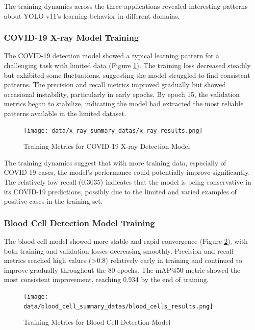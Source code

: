 \begin{multicols}{2}
The training dynamics across the three applications revealed interesting patterns about YOLO v11's learning behavior in different domains.

\subsubsection{COVID-19 X-ray Model Training}

The COVID-19 detection model showed a typical learning pattern for a challenging task with limited data (Figure \ref{fig:covid_training}). The training loss decreased steadily but exhibited some fluctuations, suggesting the model struggled to find consistent patterns. The precision and recall metrics improved gradually but showed occasional instability, particularly in early epochs. By epoch 15, the validation metrics began to stabilize, indicating the model had extracted the most reliable patterns available in the limited dataset.

\begin{figure}[h]
\centering
\texttt{[image: data/x\_ray\_summary\_datas/x\_ray\_results.png]}
\caption{Training Metrics for COVID-19 X-ray Detection Model}
\label{fig:covid_training}
\end{figure}

The training dynamics suggest that with more training data, especially of COVID-19 cases, the model's performance could potentially improve significantly. The relatively low recall (0.3035) indicates that the model is being conservative in its COVID-19 predictions, possibly due to the limited and varied examples of positive cases in the training set.

\subsubsection{Blood Cell Detection Model Training}

The blood cell model showed more stable and rapid convergence (Figure \ref{fig:blood_cell_training}), with both training and validation losses decreasing smoothly. Precision and recall metrics reached high values (>0.8) relatively early in training and continued to improve gradually throughout the 80 epochs. The mAP@50 metric showed the most consistent improvement, reaching 0.934 by the end of training.

\begin{figure}[h]
\centering
\texttt{[image: data/blood\_cell\_summary\_datas/blood\_cells\_results.png]}
\caption{Training Metrics for Blood Cell Detection Model}
\label{fig:blood_cell_training}
\end{figure}


\end{multicols}
